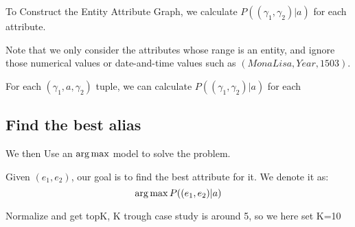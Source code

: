To Construct the Entity Attribute Graph, we calculate $P((\gamma_{1},\gamma_{2}) |a)$ for each attribute.




Note that we only consider the attributes whose range is an entity, and ignore those numerical values or date-and-time values such as $( Mona Lisa, Year, 1503)$.





For each $(\gamma_{1},a,\gamma_{2})$ tuple, we can calculate $P((\gamma_{1},\gamma_{2}) |a)$ for each








\subsection{Find the best alias}

We then Use an $\operatorname*{arg\,max}$ model to solve the problem.

Given $(e_1,e_2)$, our goal is to find the best attribute for it. We denote it as:
$$\operatorname*{arg\,max} P((e_1,e_2)|a)$$




Normalize and get topK, K trough case study is around 5, so we here set K=10

